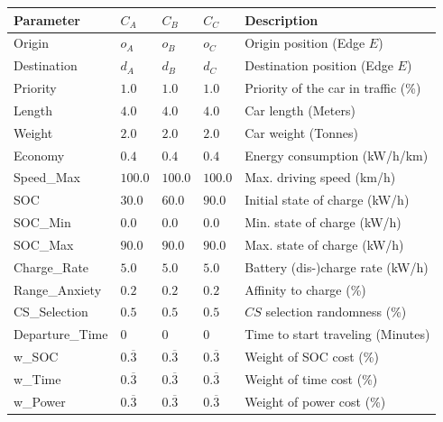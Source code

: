 \begin{table}[h]
	\renewcommand{\arraystretch}{1.3}
	\centering
	\begin{tabularx}{\columnwidth}{llllX}
		\hline
		\textbf{Parameter}          & \textbf{$C_{A}$} & \textbf{$C_{B}$}  & \textbf{$C_{C}$}           & \textbf{Description} \\ \hline
		Origin                      & $o_A$     & $o_B$ & $o_C$    & Origin position (Edge $E$)      \\
		Destination                 & $d_A$    & $d_B$  & $d_C$     & Destination position (Edge $E$) \\
		Priority                  & $1.0$ & $1.0$ & $1.0$ & Priority of the car in traffic (\%)                  \\
		Length                    & $4.0$ & $4.0$ & $4.0$ & Car length (Meters)            \\
		Weight                  & $2.0$ & $2.0$ & $2.0$ & Car weight  (Tonnes)                 \\
		Economy				& $0.4$ & $0.4$ & $0.4$ & Energy consumption (kW/h/km) \\
		Speed\_Max				& $100.0$ & $100.0$ & $100.0$ & Max. driving speed (km/h) \\
		SOC                      & $30.0$ & $60.0$ & $90.0$ & Initial state of charge (kW/h)                   \\
		SOC\_Min               & $0.0$ & $0.0$ & $0.0$ & Min. state of charge (kW/h)                     \\
		SOC\_Max              & $90.0$ & $90.0$ & $90.0$ & Max. state of charge (kW/h)                      \\
		Charge\_Rate          & $5.0$ & $5.0$ & $5.0$ & Battery (dis-)charge rate (kW/h)                    \\
		Range\_Anxiety         & $0.2$ & $0.2$ & $0.2$ & Affinity to charge (\%)                     \\
		CS\_Selection		   & $0.5$ & $0.5$ & $0.5$ & $CS$ selection randomness (\%)                    \\ 
		Departure\_Time 	& $0$ & $0$ & $0$ & Time to start traveling (Minutes)                   \\
		w\_SOC              & $0.\overline{3}$  & $0.\overline{3}$ & $0.\overline{3}$ & Weight of SOC cost (\%)                   \\
		w\_Time              & $0.\overline{3}$ & $0.\overline{3}$ & $0.\overline{3}$ & Weight of time cost (\%)                     \\
		w\_Power             & $0.\overline{3}$ & $0.\overline{3}$ & $0.\overline{3}$ & Weight of power cost (\%)                      \\ \hline
	\end{tabularx}
\end{table}

